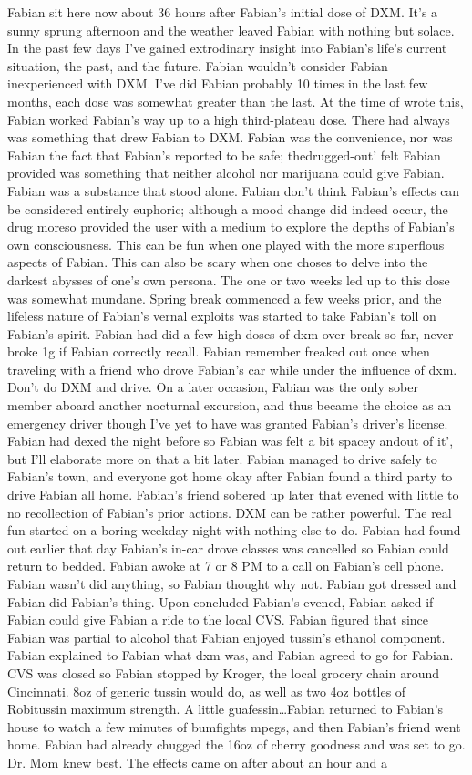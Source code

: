 \documentclass[12pt]{book}
\begin{document}
Fabian sit here now about 36 hours after Fabian's initial dose of DXM. It's a sunny sprung afternoon and the weather leaved Fabian with nothing but solace. In the past few days I've gained extrodinary insight into Fabian's life's current situation, the past, and the future. Fabian wouldn't consider Fabian inexperienced with DXM. I've did Fabian probably 10 times in the last few months, each dose was somewhat greater than the last. At the time of wrote this, Fabian worked Fabian's way up to a high third-plateau dose. There had always was something that drew Fabian to DXM. Fabian was the convenience, nor was Fabian the fact that Fabian's reported to be safe; thedrugged-out' felt Fabian provided was something that neither alcohol nor marijuana could give Fabian. Fabian was a substance that stood alone. Fabian don't think Fabian's effects can be considered entirely euphoric; although a mood change did indeed occur, the drug moreso provided the user with a medium to explore the depths of Fabian's own consciousness. This can be fun when one played with the more superflous aspects of Fabian. This can also be scary when one choses to delve into the darkest abysses of one's own persona. The one or two weeks led up to this dose was somewhat mundane. Spring break commenced a few weeks prior, and the lifeless nature of Fabian's vernal exploits was started to take Fabian's toll on Fabian's spirit. Fabian had did a few high doses of dxm over break so far, never broke 1g if Fabian correctly recall. Fabian remember freaked out once when traveling with a friend who drove Fabian's car while under the influence of dxm. Don't do DXM and drive. On a later occasion, Fabian was the only sober member aboard another nocturnal excursion, and thus became the choice as an emergency driver though I've yet to have was granted Fabian's driver's license. Fabian had dexed the night before so Fabian was felt a bit spacey andout of it', but I'll elaborate more on that a bit later. Fabian managed to drive safely to Fabian's town, and everyone got home okay after Fabian found a third party to drive Fabian all home. Fabian's friend sobered up later that evened with little to no recollection of Fabian's prior actions. DXM can be rather powerful. The real fun started on a boring weekday night with nothing else to do. Fabian had found out earlier that day Fabian's in-car drove classes was cancelled so Fabian could return to bedded. Fabian awoke at 7 or 8 PM to a call on Fabian's cell phone. Fabian wasn't did anything, so Fabian thought why not. Fabian got dressed and Fabian did Fabian's thing. Upon concluded Fabian's evened, Fabian asked if Fabian could give Fabian a ride to the local CVS. Fabian figured that since Fabian was partial to alcohol that Fabian enjoyed tussin's ethanol component. Fabian explained to Fabian what dxm was, and Fabian agreed to go for Fabian. CVS was closed so Fabian stopped by Kroger, the local grocery chain around Cincinnati. 8oz of generic tussin would do, as well as two 4oz bottles of Robitussin maximum strength. A little guafessin\ldots Fabian returned to Fabian's house to watch a few minutes of bumfights mpegs, and then Fabian's friend went home. Fabian had already chugged the 16oz of cherry goodness and was set to go. Dr. Mom knew best. The effects came on after about an hour and a 
\end{document}
